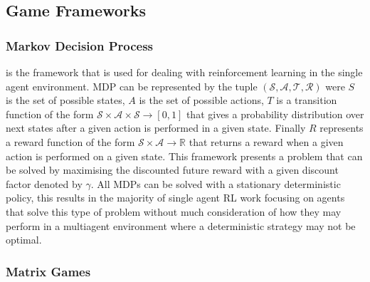 \documentclass{article}
\begin{document}
\subsection{Game Frameworks}

\subsubsection{Markov Decision Process} is the framework that is used for dealing with reinforcement
learning in the single agent environment. MDP can be represented by the tuple 
$(\mathcal{S}, \mathcal{A}, \mathcal{T}, \mathcal{R})$ were $S$ is the set of possible
states, $A$ is the set of possible actions, $T$ is a transition function of the form 
$\mathcal{S}\times\mathcal{A}\times\mathcal{S}\rightarrow [0,1]$ that gives a probability
distribution over next states after a given action is performed in a given state. Finally
$R$ represents a reward function of the form $\mathcal{S}\times\mathcal{A}\rightarrow \mathbb{R}$
that returns a reward when a given action is performed on a given state. This framework presents a problem that can be solved by maximising the discounted
future reward with a given discount factor denoted by $\gamma$. All MDPs can be solved
with a stationary deterministic policy, this results in the majority of single agent
RL work focusing on agents that solve this type of problem without much consideration
of how they may perform in a multiagent environment where a deterministic strategy may
not be optimal.

\subsubsection{Matrix Games}
\end{document}
